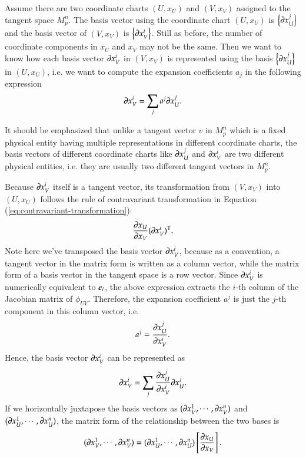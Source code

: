 \documentclass[11pt, a4paper]{book}
\begin{document}
Assume there are two coordinate charts $(U,x_U)$ and $(V,x_V)$ assigned to the tangent
space $M_p^n$. The basis vector using the coordinate chart $(U,x_U)$ is
$\left\{ \boldsymbol{\partial}x_U^j \right\}$ and the basis vector of $(V,x_V)$ is
$\left\{ \boldsymbol{\partial}x_V^i \right\}$. Still as before, the number of coordinate
components in $x_U$ and $x_V$ may not be the same. Then we want to know how each basis
vector $\boldsymbol{\partial}x_V^i$ in $(V,x_V)$ is represented using the basis
$\left\{ \boldsymbol{\partial}x_U^j \right\}$ in $(U,x_U)$, i.e. we want to compute the expansion
coefficients $a_j$ in the following expression
\begin{equation*}
  \boldsymbol{\partial}x_V^i = \sum_j a^j \boldsymbol{\partial}x_U^j.
\end{equation*}
\begin{Remark}
  It should be emphasized that unlike a tangent vector $v$ in $M_p^n$ which is a fixed physical
  entity having multiple representations in different coordinate charts, the basis vectors
  of different coordinate charts like $\boldsymbol{\partial}x_U^j$ and $\boldsymbol{\partial}x_V^i$ are
  two different physical entities, i.e. they are usually two different tangent vectors in
  $M_p^n$.
\end{Remark}

Because $\boldsymbol{\partial}x_V^i$ itself is a tangent vector, its transformation from $(V,x_V)$
into $(U,x_U)$ follows the rule of contravariant transformation in Equation
(\ref{eq:contravariant-transformation}):
\begin{equation*}
  \frac{\partial x_U}{\partial x_V} (\boldsymbol{\partial}x_V^i)^{\mathrm{T}}.
\end{equation*}
Note here we've transposed the basis vector $\boldsymbol{\partial}x_V^i$, because as a convention,
a tangent vector in the matrix form is written as a column vector, while the matrix form
of a basis vector in the tangent space is a row vector. Since $\boldsymbol{\partial}x_V^i$ is
numerically equivalent to $\boldsymbol{e}_i$, the above expression extracts the $i$-th column of
the Jacobian matrix of $\phi_{UV}$. Therefore, the expansion coefficient $a^{j}$ is just the
$j$-th component in this column vector, i.e.
\begin{equation}
  a^j = \frac{\partial x_U^j}{\partial x_V^i}.
\end{equation}
Hence, the basis vector $\boldsymbol{\partial}x_V^i$ can be represented as
\begin{equation}
  \label{eq:tangent-vector-basis-relation}
  \boldsymbol{\partial}x_V^i = \sum_j \frac{\partial x_U^j}{\partial x_V^i} \boldsymbol{\partial}x_U^j.
\end{equation}
If we horizontally juxtapose the basis vectors as
$(\boldsymbol{\partial}x_V^1,\cdots,\boldsymbol{\partial}x_V^n)$ and
$(\boldsymbol{\partial}x_U^1,\cdots,\boldsymbol{\partial}x_U^n)$, the matrix form of the
relationship between the two bases is
\begin{equation}
  \label{eq:tangent-space-bases-relation}
  (\boldsymbol{\partial}x_V^1,\cdots,\boldsymbol{\partial}x_V^n) =
  (\boldsymbol{\partial}x_U^1,\cdots,\boldsymbol{\partial}x_U^n) \left[ \frac{\partial x_U}{\partial x_V} \right].
\end{equation}
\end{document}
